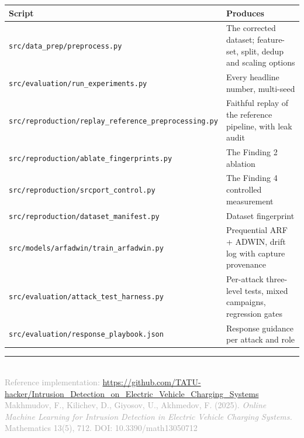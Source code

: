\documentclass[11pt, a4paper]{article}
\newcommand{\col}[1]{\texttt{\small #1}}
\begin{document}
\begin{table}[h]
\centering
\small
\begin{tabularx}{\textwidth}{lX}
\toprule
\textbf{Script} & \textbf{Produces} \\
\midrule
\col{src/data\_prep/preprocess.py}                       & The corrected dataset; feature-set, split, dedup and scaling options \\
\col{src/evaluation/run\_experiments.py}                 & Every headline number, multi-seed \\
\col{src/reproduction/replay\_reference\_preprocessing.py} & Faithful replay of the reference pipeline, with leak audit \\
\col{src/reproduction/ablate\_fingerprints.py}           & The Finding 2 ablation \\
\col{src/reproduction/srcport\_control.py}               & The Finding 4 controlled measurement \\
\col{src/reproduction/dataset\_manifest.py}              & Dataset fingerprint \\
\col{src/models/arfadwin/train\_arfadwin.py}             & Prequential ARF + ADWIN, drift log with capture provenance \\
\col{src/evaluation/attack\_test\_harness.py}            & Per-attack three-level tests, mixed campaigns, regression gates \\
\col{src/evaluation/response\_playbook.json}             & Response guidance per attack and role \\
\bottomrule
\end{tabularx}
\end{table}

\vfill
\noindent\rule{\textwidth}{0.4pt}\\
{\footnotesize\textcolor{darkgray}%
{Reference implementation:
\url{https://github.com/TATU-hacker/Intrusion_Detection_on_Electric_Vehicle_Charging_Systems}\\
Makhmudov, F., Kilichev, D., Giyosov, U., Akhmedov, F. (2025).
\emph{Online Machine Learning for Intrusion Detection in Electric Vehicle
Charging Systems.} Mathematics 13(5), 712. DOI: 10.3390/math13050712}}
\end{document}
